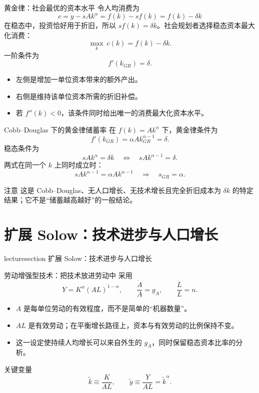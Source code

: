 \documentclass[aspectratio=32]{beamer}
\newcommand{\lecturesectionpage}[1]{%
\begin{frame}[plain]
\begin{center}
\vfill
\begin{beamercolorbox}[wd=0.74\textwidth,rounded=true,shadow=true,center,sep=1em]{lecturesection}
\LARGE #1
\end{beamercolorbox}
\vfill
\end{center}
\end{frame}
}
\begin{document}
\begin{frame}{黄金律：社会最优的资本水平}
\small
令人均消费为
\[
  c=y-sAk^\alpha=f(k)-s f(k)=f(k)-\delta k
\]
在稳态中，投资恰好用于折旧，所以 $s f(k)=\delta k$。社会规划者选择稳态资本最大化消费：
\[
  \max_k\ c(k)=f(k)-\delta k.
\]
一阶条件为
\[
  \boxed{f'(k_{GR})=\delta}.
\]
\begin{itemize}
  \item 左侧是增加一单位资本带来的额外产出。
  \item 右侧是维持该单位资本所需的折旧补偿。
  \item 若 $f''(k)<0$，该条件同时给出唯一的消费最大化资本水平。
\end{itemize}
\end{frame}

\begin{frame}{Cobb--Douglas 下的黄金律储蓄率}
\small
在 $f(k)=Ak^\alpha$ 下，黄金律条件为
\[
  f'(k_{GR})=\alpha A k_{GR}^{\alpha-1}=\delta.
\]
稳态条件为
\[
  sAk^{\alpha}=\delta k
  \quad\Longleftrightarrow\quad
  sAk^{\alpha-1}=\delta.
\]
两式在同一个 $k$ 上同时成立时：
\[
  sAk^{\alpha-1}=\alpha Ak^{\alpha-1}
  \quad\Rightarrow\quad
  \boxed{s_{GR}=\alpha}.
\]
\begin{alertblock}{注意}
这是 Cobb--Douglas、无人口增长、无技术增长且完全折旧成本为 $\delta k$ 的特定结果；它不是“储蓄越高越好”的一般结论。
\end{alertblock}
\end{frame}

\section{扩展 Solow：技术进步与人口增长}
\lecturesectionpage{扩展 Solow：技术进步与人口增长}

\begin{frame}{劳动增强型技术：把技术放进劳动中}
\small
采用
\[
  Y=K^\alpha(AL)^{1-\alpha},
  \qquad
  \frac{\dot A}{A}=g_A,
  \qquad
  \frac{\dot L}{L}=n.
\]
\begin{itemize}
  \item $A$ 是每单位劳动的有效程度，而不是简单的“机器数量”。
  \item $AL$ 是有效劳动；在平衡增长路径上，资本与有效劳动的比例保持不变。
  \item 这一设定使持续人均增长可以来自外生的 $g_A$，同时保留稳态资本比率的分析。
\end{itemize}
\begin{block}{关键变量}
\[
  \tilde k\equiv\frac{K}{AL},
  \qquad
  \tilde y\equiv\frac{Y}{AL}=\tilde k^\alpha.
\]
\end{block}
\end{frame}
\end{document}

